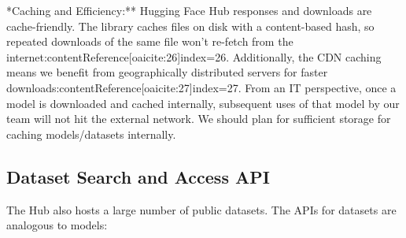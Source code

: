 \documentclass{article}
\begin{document}
\noindent **Caching and Efficiency:** Hugging Face Hub responses and downloads are cache-friendly. The library caches files on disk with a content-based hash, so repeated downloads of the same file won’t re-fetch from the internet:contentReference[oaicite:26]{index=26}. Additionally, the CDN caching means we benefit from geographically distributed servers for faster downloads:contentReference[oaicite:27]{index=27}. From an IT perspective, once a model is downloaded and cached internally, subsequent uses of that model by our team will not hit the external network. We should plan for sufficient storage for caching models/datasets internally.

\subsection{Dataset Search and Access API}
The Hub also hosts a large number of public datasets. The APIs for datasets are analogous to models:
\end{document}
